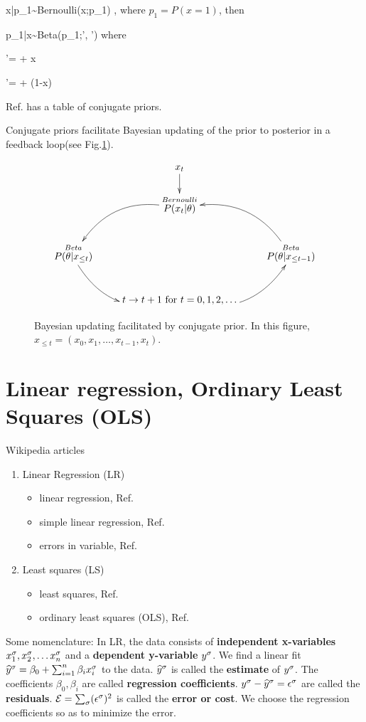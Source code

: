 \beq
x|p_1\sim {\rm Bernoulli}(x;p_1)
\;,
\eeq
where $p_1=P(x=1)$,
then

\beq
p_1|x\sim {\rm Beta}(p_1;\alp', \beta')
\eeq
where

\beq
\alp'= \alp + x
\eeq

\beq
\beta'= \beta + (1-x)
\eeq


Ref.\cite{wiki-conj-prior}
has a table of
conjugate priors.

Conjugate priors facilitate
Bayesian updating
of the prior to
posterior in a
feedback loop(see Fig.\ref{fig-conj-prior}).

\begin{figure}[h!]
$$\xymatrix{
&x_t\ar[d]
\\
&\stackrel{Bernoulli}{P(x_t|\theta)}\ar@/_2pc/[ld]
\\
\stackrel{Beta}{P(\theta|x_{\leq t})}\ar@/_2pc/[rd]
&&\stackrel{Beta}{P(\theta|x_{\leq t-1})}\ar@/_2pc/[ul]
\\
&t\rarrow t+1 \text{ for } t=0, 1, 2,\ldots
\ar@/_2pc/[ur]
}$$
\caption{Bayesian updating facilitated
by conjugate prior. In this figure,
$x_{\leq t}=(x_0, x_1, \ldots, x_{t-1}, x_t)$.}
\label{fig-conj-prior}
\end{figure}


\section{Linear regression, Ordinary Least Squares (OLS)}
\label{sec-conv-lr}
Wikipedia articles
\begin{enumerate}
\item
Linear Regression (LR)
\begin{itemize}
\item
linear regression, Ref.\cite{wiki-lr}
\item
 simple linear regression, Ref.\cite{wiki-slr}
\item
errors in variable, Ref.\cite{wiki-errors-in-iv}

\end{itemize}
\item
Least squares (LS)
\begin{itemize}
\item
least squares, Ref.\cite{wiki-lsquares}
\item
ordinary least squares (OLS), Ref.\cite{wiki-ols}
\end{itemize}
\end{enumerate}


Some nomenclature: In LR, the
data consists of
{\bf independent x-variables} $x^\sigma_1,
 x^\sigma_2, \ldots x^\sigma_n$
and a {\bf dependent y-variable} $y^\sigma$.
We find a linear fit ${\widehat{y}}^\sigma =
\beta_0 + \sum_{i=1}^n \beta_i x^\sigma_i$
to the data.
${\widehat{y}}^\sigma$ is called the {\bf estimate}
of $y^\sigma$.
 The coefficients $\beta_0, \beta_i$
are called {\bf regression coefficients}.
$y^\sigma-{\widehat{y}}^\sigma=\epsilon^\sigma$
are called  the {\bf residuals}.
${\cal E} =\sum_\sigma (\epsilon^\sigma)^2$
is called the {\bf error or cost}. We choose the
regression coefficients
so as to minimize the error.

